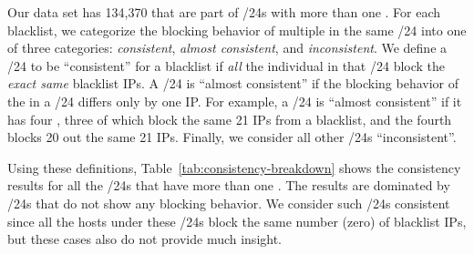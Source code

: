 

Our data set has 134,370 {} that are part of /24s with more
than one {}.  For each blacklist, we categorize the blocking
behavior of multiple {} in the same /24 into one of three
categories: \textit{consistent}, \textit{almost consistent}, and
\textit{inconsistent}.  We define a /24 to be ``consistent'' for a
blacklist if \textit{all} the individual {} in that /24
block the \textit{exact same} blacklist IPs.
%
A /24 is ``almost consistent'' if the blocking behavior of the
{} in a /24 differs only by one IP. For example, a /24 is
``almost consistent'' if it has four {}, three of which
block the same 21 IPs from a blacklist, and the fourth {}
blocks 20 out the same 21 IPs.
%
Finally, we consider all other /24s ``inconsistent''.




Using these definitions, Table~\ref{tab:consistency-breakdown} shows
the consistency results for all the /24s that have more than one
{}.  The results are dominated by /24s that do not show any
blocking behavior.  We consider such /24s consistent since all the
hosts under these /24s block the same number (zero) of blacklist IPs,
but these cases also do not provide much insight.

